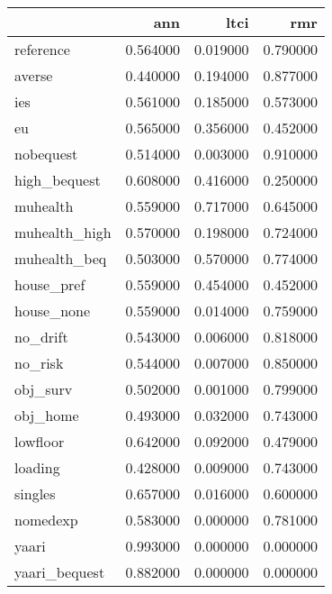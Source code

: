 \begin{tabular}{lrrr}
\toprule
 & ann & ltci & rmr \\
\midrule
reference & 0.564000 & 0.019000 & 0.790000 \\
averse & 0.440000 & 0.194000 & 0.877000 \\
ies & 0.561000 & 0.185000 & 0.573000 \\
eu & 0.565000 & 0.356000 & 0.452000 \\
nobequest & 0.514000 & 0.003000 & 0.910000 \\
high_bequest & 0.608000 & 0.416000 & 0.250000 \\
muhealth & 0.559000 & 0.717000 & 0.645000 \\
muhealth_high & 0.570000 & 0.198000 & 0.724000 \\
muhealth_beq & 0.503000 & 0.570000 & 0.774000 \\
house_pref & 0.559000 & 0.454000 & 0.452000 \\
house_none & 0.559000 & 0.014000 & 0.759000 \\
no_drift & 0.543000 & 0.006000 & 0.818000 \\
no_risk & 0.544000 & 0.007000 & 0.850000 \\
obj_surv & 0.502000 & 0.001000 & 0.799000 \\
obj_home & 0.493000 & 0.032000 & 0.743000 \\
lowfloor & 0.642000 & 0.092000 & 0.479000 \\
loading & 0.428000 & 0.009000 & 0.743000 \\
singles & 0.657000 & 0.016000 & 0.600000 \\
nomedexp & 0.583000 & 0.000000 & 0.781000 \\
yaari & 0.993000 & 0.000000 & 0.000000 \\
yaari_bequest & 0.882000 & 0.000000 & 0.000000 \\
\bottomrule
\end{tabular}
